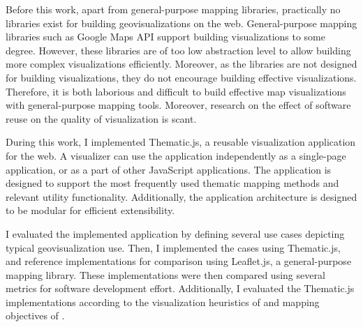 
Before this work, apart from general-purpose mapping libraries, practically no libraries exist for building geovisualizations on the web. General-purpose mapping libraries such as Google Maps API support building visualizations to some degree. However, these libraries are of too low abstraction level to allow building more complex visualizations efficiently. Moreover, as the libraries are not designed for building visualizations, they do not encourage building effective visualizations. Therefore, it is both laborious and difficult to build effective map visualizations with general-purpose mapping tools. Moreover, research on the effect of software reuse on the quality of visualization is scant.

During this work, I implemented Thematic.js, a reusable visualization application for the web. A visualizer can use the application independently as a single-page application, or as a part of other JavaScript applications. The application is designed to support the most frequently used thematic mapping methods and relevant utility functionality. Additionally, the application architecture is designed to be modular for efficient extensibility.

I evaluated the implemented application by defining several use cases depicting typical geovisualization use. Then, I implemented the cases using Thematic.js, and reference implementations for comparison using Leaflet.js, a general-purpose mapping library. These implementations were then compared using several metrics for software development effort. Additionally, I evaluated the Thematic.js implementations according to the visualization heuristics of \citet{zuk_heuristics_2006} and mapping objectives of \citet{schlichtmann_visualization_2002}.

